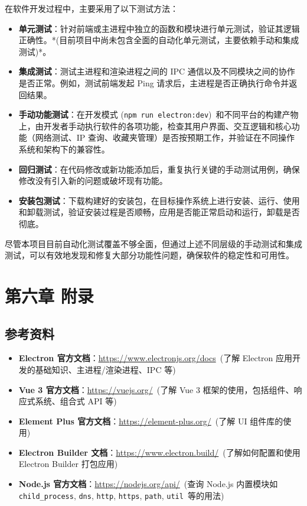 \documentclass{article}
\begin{document}
在软件开发过程中，主要采用了以下测试方法：

\begin{itemize}
    \item \textbf{单元测试}：针对前端或主进程中独立的函数和模块进行单元测试，验证其逻辑正确性。*(目前项目中尚未包含全面的自动化单元测试，主要依赖手动和集成测试)*。
    \item \textbf{集成测试}：测试主进程和渲染进程之间的 IPC 通信以及不同模块之间的协作是否正常。例如，测试前端发起 Ping 请求后，主进程是否正确执行命令并返回结果。
    \item \textbf{手动功能测试}：在开发模式 (\texttt{npm run electron:dev})\ 和不同平台的构建产物上，由开发者手动执行软件的各项功能，检查其用户界面、交互逻辑和核心功能（网络测试、IP 查询、收藏夹管理）是否按预期工作，并验证在不同操作系统和架构下的兼容性。
    \item \textbf{回归测试}：在代码修改或新功能添加后，重复执行关键的手动测试用例，确保修改没有引入新的问题或破坏现有功能。
    \item \textbf{安装包测试}：下载构建好的安装包，在目标操作系统上进行安装、运行、使用和卸载测试，验证安装过程是否顺畅，应用是否能正常启动和运行，卸载是否彻底。
\end{itemize}

尽管本项目目前自动化测试覆盖不够全面，但通过上述不同层级的手动测试和集成测试，可以有效地发现和修复大部分功能性问题，确保软件的稳定性和可用性。

\hrulefill

\section*{第六章 附录}

\subsection*{参考资料}

\begin{itemize}
    \item \textbf{Electron 官方文档}：\href{https://www.electronjs.org/docs}{https://www.electronjs.org/docs}\ (了解 Electron 应用开发的基础知识、主进程/渲染进程、IPC 等)
    \item \textbf{Vue 3 官方文档}：\href{https://vuejs.org/}{https://vuejs.org/}\ (了解 Vue 3 框架的使用，包括组件、响应式系统、组合式 API 等)
    \item \textbf{Element Plus 官方文档}：\href{https://element-plus.org/}{https://element-plus.org/}\ (了解 UI 组件库的使用)
    \item \textbf{Electron Builder 文档}：\href{https://www.electron.build/}{https://www.electron.build/}\ (了解如何配置和使用 Electron Builder 打包应用)
    \item \textbf{Node.js 官方文档}：\href{https://nodejs.org/api/}{https://nodejs.org/api/}\ (查询 Node.js 内置模块如 \texttt{child\_process}, \texttt{dns}, \texttt{http}, \texttt{https}, \texttt{path}, \texttt{util}\ 等的用法)
\end{itemize}
\end{document}

